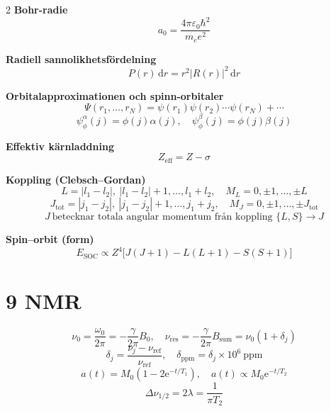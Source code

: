 \documentclass[10pt,a4paper]{article}
\newcommand{\dd}{\mathrm{d}}
\newcommand{\e}{\mathrm{e}}
\newcommand{\epsz}{\varepsilon_0}
\begin{document}
\begin{multicols*}{2}
\textbf{Bohr-radie}
\[
 a_0=\frac{4\pi\epsz\hbar^2}{m_e e^2}
\]

\textbf{Radiell sannolikhetsf\"ordelning}
\[
P(r)\,\dd r=r^2|R(r)|^2\,\dd r
\]

\textbf{Orbitalapproximationen och spinn-orbitaler}
\[
\Psi(r_1,\dots,r_N)=\psi(r_1)\psi(r_2)\cdots\psi(r_N)+\cdots
\]
\[ \psi_{\phi}^{\alpha}(j)=\phi(j)\alpha(j), \quad\psi_{\phi}^{\beta}(j)=\phi(j)\beta(j)
\]

\textbf{Effektiv k\"arnladdning}
\[
Z_{\text{eff}}=Z-\sigma
\]

\textbf{Koppling (Clebsch--Gordan)}
\[
L=|l_1-l_2|,\ |l_1-l_2|+1,\dots,l_1+l_2,\quad M_L=0,\pm1,\dots,\pm L
\]
\[
J_{\text{tot}}=|j_1-j_2|,\ |j_1-j_2|+1,\dots, j_1+j_2,\quad M_J=0,\pm1,\dots,\pm J_{\text{tot}}
\]
\[
J\ \text{betecknar totala angular momentum fr\aa n koppling }\{L,S\}\to J
\]

\textbf{Spin--orbit (form)}
\[
E_{\mathrm{SOC}}\propto Z^4\bigl[J(J+1)-L(L+1)-S(S+1)\bigr]
\]

\section*{9 NMR}

\[
\nu_0=\frac{\omega_0}{2\pi}= -\frac{\gamma}{2\pi}B_0,\quad
\nu_{\text{res}}=-\frac{\gamma}{2\pi}B_{\text{sum}}=\nu_0(1+\delta_j)
\]
\[
\delta_j=\frac{\nu_j-\nu_{\mathrm{ref}}}{\nu_{\mathrm{ref}}},\quad
\delta_{\mathrm{ppm}}=\delta_j\times 10^6\ \text{ppm}
\]
\[
 a(t)=M_0\left(1-2\e^{-t/T_1}\right),\quad a(t)\propto M_0\e^{-t/T_2}
\]
\[
\Delta\nu_{1/2}=2\lambda=\frac{1}{\pi T_2}
\]

\end{multicols*}
\end{document}
